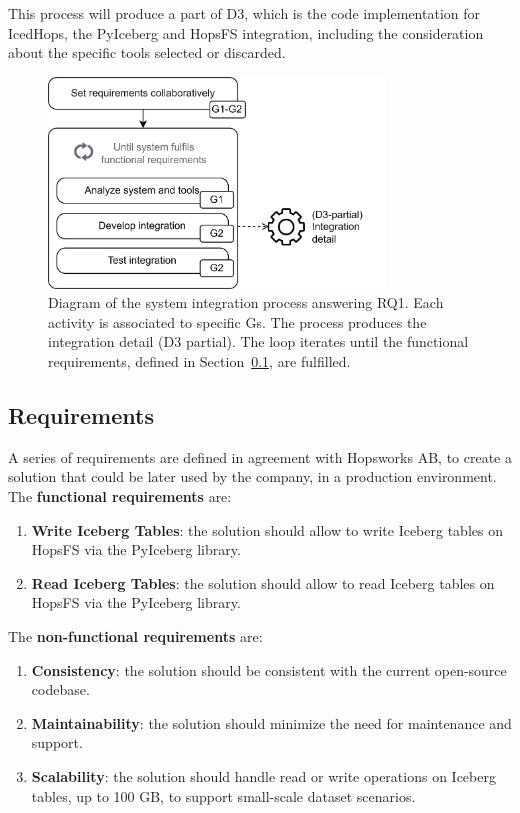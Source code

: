 This process will produce a part of \gls{D}3, which is the code implementation for IcedHops, the PyIceberg and \gls{HopsFS} integration, including the consideration about the specific tools selected or discarded.

\begin{figure}[!t]
    \begin{center}
      \includegraphics[width=0.8\textwidth]{figures/3-method/method_code.png}
    \caption[System integration process]{Diagram of the system integration process answering \gls{RQ}1. Each activity is associated to specific \glspl{G}. The process produces the integration detail (\gls{D}3 partial). The loop iterates until the functional requirements, defined in Section~\ref{subsec:integration_reqs}, are fulfilled.}
    \label{fig:method_code_schema}
    \end{center}
\end{figure}


\subsection{Requirements}
\label{subsec:integration_reqs}
A series of requirements are defined in agreement with Hopsworks AB, to create a solution that could be later used by the company, in a production environment. The \textbf{functional requirements} are:
\begin{enumerate}
    \item \textbf{Write Iceberg Tables}: the solution should allow to write Iceberg tables on \gls{HopsFS} via the PyIceberg library.
    \item \textbf{Read Iceberg Tables}: the solution should allow to read Iceberg tables on \gls{HopsFS} via the PyIceberg library.
\end{enumerate}
The \textbf{non-functional requirements} are:
\begin{enumerate}
    \item \textbf{Consistency}: the solution should be consistent with the current open-source codebase.
    \item \textbf{Maintainability}: the solution should minimize the need for maintenance and support.
    \item \textbf{Scalability}: the solution should handle read or write operations on Iceberg tables, up to 100 GB, to support small-scale dataset scenarios.
\end{enumerate}


